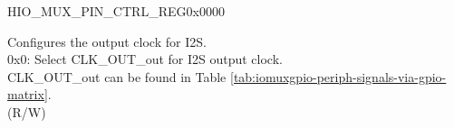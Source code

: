 \begin{register}{H}{IO\_MUX\_PIN\_CTRL\_REG}{0x0000}\label{regdesc:IOMUXPINCTRLREG}
%
%
%
%
\regnewline%
\begin{regdesc}\begin{reglist}
\label{fielddesc:IOMUXCLKOUT1}\item [IO\_MUX\_CLK\_OUT\regindex{x} (\regindex{x}: 1 - 3)] Configures the output clock for I2S.\\
0x0: Select CLK\_OUT\_out for I2S output clock.\\
CLK\_OUT\_out can be found in Table \ref{tab:iomuxgpio-periph-signals-via-gpio-matrix}. \\(R/W)
\end{reglist}\end{regdesc}
\end{register}


